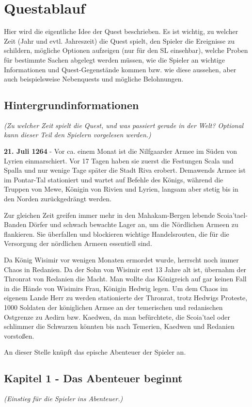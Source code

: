 \chapter{Questablauf}
Hier wird die eigentliche Idee der Quest beschrieben. Es ist wichtig, zu welcher Zeit (Jahr und evtl. Jahreszeit) die Quest spielt, den Spieler die Ereignisse zu schildern, mögliche Optionen aufzeigen (nur für den SL einsehbar), welche Proben für bestimmte Sachen abgelegt werden müssen, wie die Spieler an wichtige Informationen und Quest-Gegenstände kommen bzw. wie diese aussehen, aber auch beispielsweise Nebenquests und mögliche Belohnungen.

\section{Hintergrundinformationen}
\textit{(Zu welcher Zeit spielt die Quest, und was passiert gerade in der Welt? Optional kann dieser Teil den Spielern vorgelesen werden.)}

\textbf{21. Juli 1264} - Vor ca. einem Monat ist die Nilfgaarder Armee im Süden von Lyrien einmarschiert. Vor 17 Tagen haben sie zuerst die Festungen Scala und Spalla und nur wenige Tage später die Stadt Riva erobert. Demawends Armee ist im Pontar-Tal stationiert und wartet auf Befehle des Königs, während die Truppen von Mewe, Königin von Rivien und Lyrien, langsam aber stetig bis in den Norden zurückgedrängt werden. 

Zur gleichen Zeit greifen immer mehr in den Mahakam-Bergen lebende Scoia'tael-Banden Dörfer und schwach bewachte Lager an, um die Nördlichen Armeen zu flankieren. Sie überfallen und blockieren wichtige Handelsrouten, die für die Versorgung der nördlichen Armeen essentiell sind.

Da König Wisimir vor wenigen Monaten ermordet wurde, herrscht noch immer Chaos in Redanien. Da der Sohn von Wisimir erst 13 Jahre alt ist, übernahm der Thronrat von Redanien die Macht. Man wollte das Königreich auf gar keinen Fall in die Hände von Wisimirs Frau, Königin Hedwig legen. Um dem Chaos im eigenem Lande Herr zu werden stationierte der Thronrat, trotz Hedwigs Proteste, 1000 Soldaten der königlichen Armee an der temerischen und redanischen Ostgrenze zu Aedirn bzw. Kaedwen, da man befürchtete, die Scoia'tael oder schlimmer die Schwarzen könnten bis nach Temerien, Kaedwen und Redanien vorstoßen. 

An dieser Stelle knüpft das epische Abenteuer der Spieler an.


\section{Kapitel 1 - Das Abenteuer beginnt}
\textit{(Einstieg für die Spieler ins Abenteuer.)}

